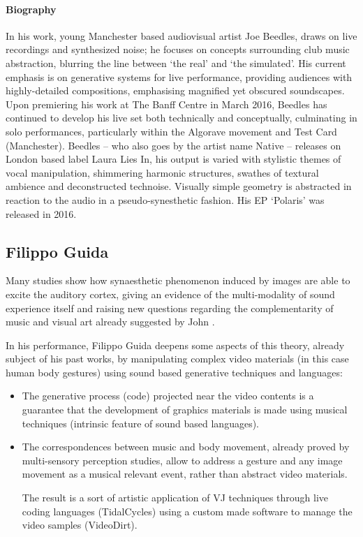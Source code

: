 \documentclass[sigplan,10pt]{acmart}\settopmatter{}
\begin{document}
\paragraph{Biography}
In his work, young Manchester based audiovisual artist Joe Beedles,
draws on live recordings and synthesized noise; he focuses on concepts
surrounding club music abstraction, blurring the line between ‘the
real’ and ‘the simulated’. His current emphasis is on generative
systems for live performance, providing audiences with highly-detailed
compositions, emphasising magnified yet obscured soundscapes.  Upon
premiering his work at The Banff Centre in March 2016, Beedles has
continued to develop his live set both technically and conceptually,
culminating in solo performances, particularly within the Algorave
movement and Test Card (Manchester). Beedles – who also goes by the
artist name Native – releases on London based label Laura Lies In, his
output is varied with stylistic themes of vocal manipulation,
shimmering harmonic structures, swathes of textural ambience and
deconstructed technoise. Visually simple geometry is abstracted in
reaction to the audio in a pseudo-synesthetic fashion. His EP
‘Polaris’ was released in 2016.

\subsection{Filippo Guida}

Many studies show how synaesthetic phenomenon induced by images are
able to excite the auditory cortex, giving an evidence of the
multi-modality of sound experience itself \citep{Riddoch12} and raising
new questions regarding the complementarity of music and visual art
already suggested by John \citet{Whitney80}.

In his performance, Filippo Guida deepens some aspects of this theory, already
subject of his past works, by manipulating complex video materials (in
this case human body gestures) using sound based generative techniques
and languages:

\begin{itemize}
\item The generative process (code) projected near the video contents is a guarantee that the development of graphics materials is made using musical techniques (intrinsic feature of sound based languages).
\item The correspondences between music and body movement, already proved by multi-sensory perception studies, allow to address a gesture and any image movement as a musical relevant event, rather than abstract video materials\citep{Haga08}.

  The result is a sort of artistic application of VJ techniques through live coding languages (TidalCycles) using a custom made software to manage the video samples (VideoDirt).
\end{itemize}
\end{document}
